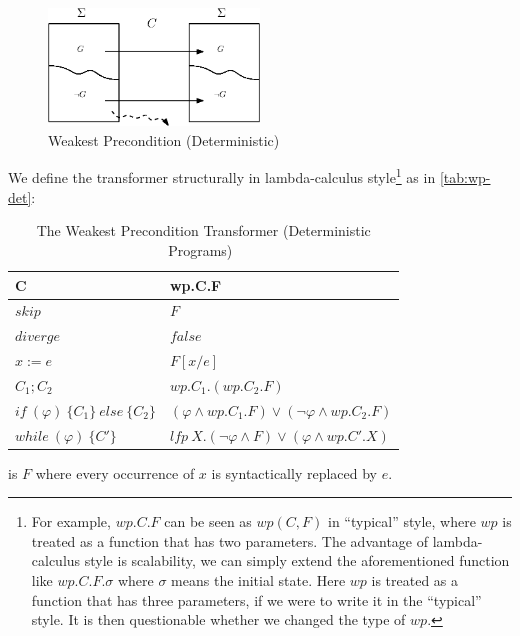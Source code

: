 \begin{figure}[ht!]\centering
\includegraphics[width=0.5\textwidth]{image/wp-det.eps}
\caption{Weakest Precondition (Deterministic)}
\label{fig:wp-det}
\end{figure}

We define the  transformer structurally in lambda-calculus style\footnote{For example, $wp.C.F$ can be seen as $wp(C,F)$ in ``typical'' style, where $wp$ is treated as a function that has two parameters. The advantage of lambda-calculus style is scalability, we can simply extend the aforementioned function like $wp.C.F.\sigma$ where $\sigma$ means the initial state. Here $wp$ is treated as a function that has three parameters, if we were to write it in the ``typical'' style. It is then questionable whether we changed the type of $wp$. } as in \autoref{tab:wp-det}: 

\begin{table}[ht!]\centering
    \begin{tabular}{ll}
    \hline\hline
      \textbf{C}&\textbf{wp.C.F}    \\ \hline
      $skip$&   $F$   \\
      $diverge$&  $false$\\
      $x:= e $&  $F[x/e]$\\
      $C_1;C_2$&  $wp.C_1.(wp.C_2.F)$\\
      $if\ (\varphi)\ \{C_1\}\ else\ \{C_2\} $&  $(\varphi\wedge wp.C_1.F)\vee(\neg\varphi\wedge wp.C_2.F)$\\
      $while\ (\varphi)\ \{C'\}$&  $lfp\ X.(\neg\varphi\wedge F)\vee(\varphi\wedge wp.C'.X)$\\
    \hline\hline
    \end{tabular}
    \caption{The Weakest Precondition Transformer (Deterministic Programs)~\cite{kaminski19}}
    \label{tab:wp-det}
\end{table}

 is $F$ where every occurrence of $x$ is syntactically replaced by $e$. 

